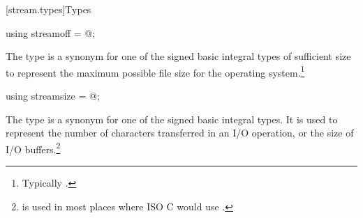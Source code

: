 [stream.types]{Types}

%
\begin{itemdecl}
using streamoff = @\impdef@;
\end{itemdecl}

\begin{itemdescr}
\pnum
The type  is a synonym for one of the signed basic integral types of
sufficient size to represent the maximum possible file size for the operating system.\footnote{Typically .}
\end{itemdescr}

%
\begin{itemdecl}
using streamsize = @\impdef@;
\end{itemdecl}

\begin{itemdescr}
\pnum
The type
is a synonym for one of the signed basic
integral types.
It is used to represent the number of characters transferred in an I/O
operation, or the size of I/O buffers.\footnote{
is used in most places where ISO C would use .}
\end{itemdescr}


